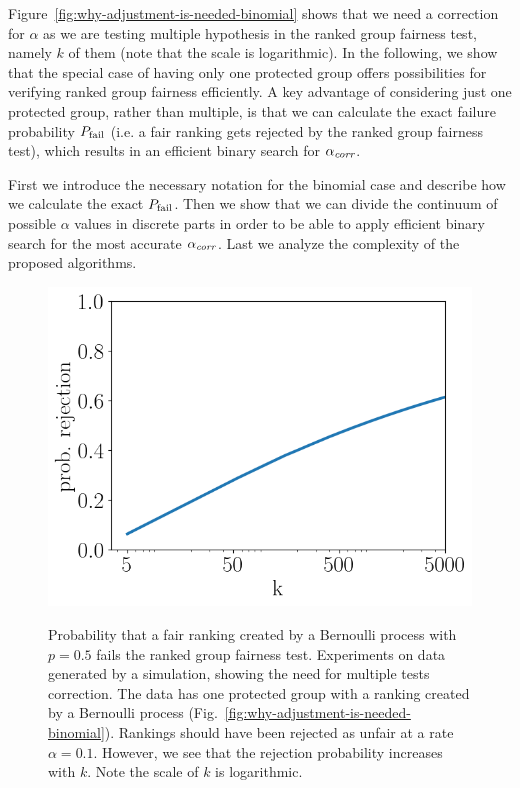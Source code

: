 Figure~\ref{fig:why-adjustment-is-needed-binomial} shows that we need a correction for $\alpha$ as we are testing multiple hypothesis in the ranked group fairness test, namely $k$ of them (note that the scale is logarithmic).
%
In the following, we show that the special case of having only one protected group offers possibilities for verifying ranked group fairness efficiently.
%
A key advantage of considering just one protected group, rather than multiple, is that we can calculate the exact failure probability $P_{\operatorname{fail}}$ (i.e. a fair ranking gets rejected by the ranked group fairness test), which results in an efficient binary search for $\alpha_\textit{corr}$.
%

First we introduce the necessary notation for the binomial case and describe how we calculate the exact $P_{\operatorname{fail}}$.
%
Then we show that we can divide the continuum of possible $\alpha$ values in discrete parts in order to be able to apply efficient binary search for the most accurate $\alpha_\textit{corr}$.
%
Last we analyze the complexity of the proposed algorithms.
%
\begin{figure}[t!]
	\centering
	{\includegraphics[width=.48\textwidth]{failProbPlotBinom.png}}
	\caption{
		Probability that a fair ranking created by a Bernoulli process with $p=0.5$ fails the ranked group fairness test.\label{fig:why-adjustment-is-needed-binomial}
		Experiments on data generated by a simulation, showing the need for multiple tests correction.
		The data has one protected group with a ranking created by  a Bernoulli process (Fig.~\ref{fig:why-adjustment-is-needed-binomial}).
		Rankings should have been rejected as unfair at a rate $\alpha = 0.1$.
		However, we see that the rejection probability increases with $k$.
		Note the scale of $k$ is logarithmic.}
	\label{fig:need-for-model-adjustment}
\end{figure}

